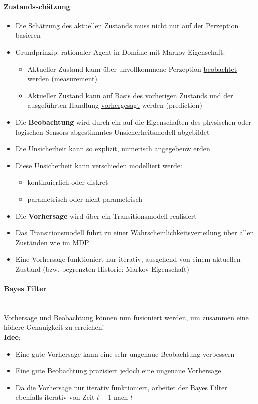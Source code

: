 \paragraph{Zustandssch\"atzung}
\begin{itemize}
	\item Die Sch\"atzung des aktuellen Zustands muss nicht nur auf der Perzeption basieren
	\item Grundprinzip: rationaler Agent in Dom\"ane mit Markov Eigenschaft:
	\begin{itemize}
		\item Aktueller Zustand kann \"uber unvollkommene Perzeption \underline{beobachtet} werden (measurement)
		\item Aktueller Zustand kann auf Basis des vorherigen Zustands und der ausgef\"uhrten Handlung \underline{vorhergesagt} werden (prediction)
	\end{itemize}
	\item Die \textbf{Beobachtung} wird durch ein auf die Eigenschaften des physischen oder logischen Sensors abgestimmtes Unsicherheitsmodell abgebildet
	\item Die Unsicherheit kann so explizit, numerisch angegebenw erden
	\item Diese Unsicherheit kann verschieden modelliert werde:
	\begin{itemize}
		\item kontinuierlich oder diskret
		\item parametrisch oder nicht-parametrisch
	\end{itemize}
	\item Die \textbf{Vorhersage} wird \"uber ein Transitionsmodell realisiert
	\item Das Transitionsmodell f\"uhrt zu einer Wahrscheinlichkeitsverteilung \"uber allen Zust\"anden wie im MDP
	\item Eine Vorhersage funktioniert nur iterativ, ausgehend von einem aktuellen Zustand (bzw. begrenzten Historie: Markov Eigenschaft)
\end{itemize}

\paragraph{Bayes Filter} {\ }\\
Vorhersage und Beobachtung k\"onnen nun fusioniert werden, um zusammen eine h\"ohere Genauigkeit zu erreichen!\\

\textbf{Idee}:
\begin{itemize}
	\item Eine gute Vorhersage kann eine sehr ungenaue Beobachtung verbessern
	\item Eine gute Beobachtung pr\"azisiert jedoch eine ungenaue Vorhersage
	\item Da die Vorhersage nur iterativ funktioniert, arbeitet der Bayes Filter ebenfalls iterativ von Zeit $t-1$ nach $t$ 
\end{itemize}

